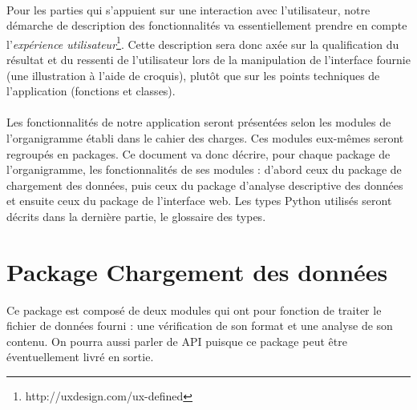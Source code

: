 		\paragraph{}Pour les parties qui s'appuient sur une interaction avec l'utilisateur, notre démarche de description des fonctionnalités va essentiellement prendre en compte l'\textit{expérience utilisateur}\footnote{http://uxdesign.com/ux-defined}. Cette description sera donc axée sur la qualification du résultat et du ressenti de l'utilisateur lors de la manipulation de l'interface fournie (une illustration à l'aide de croquis), plutôt que sur les points techniques de l'application (fonctions et classes).
		\paragraph{}Les fonctionnalités de notre application seront présentées selon les modules de l'organigramme établi dans le cahier des charges. Ces modules eux-mêmes seront regroupés en packages. Ce document va donc décrire, pour chaque package de l'organigramme, les fonctionnalités de ses modules : d'abord ceux du package de chargement des données, puis ceux du package d'analyse descriptive des données et ensuite ceux du package de l'interface web. Les types Python utilisés seront décrits dans la dernière partie, le glossaire des types.
		
	\section{Package Chargement des données}
	Ce package est composé de deux modules qui ont pour fonction de traiter le fichier de données fourni : une vérification de son format et une analyse de son contenu. On pourra aussi parler de API puisque ce package peut être éventuellement livré en sortie. 
		

